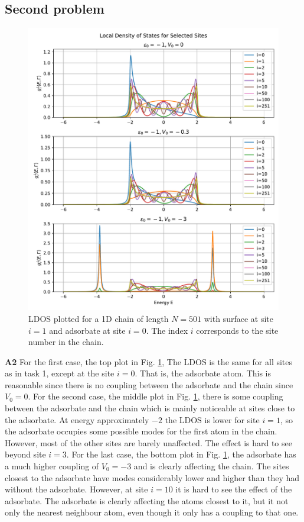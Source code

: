 \subsection{Second problem}

\begin{figure}[H]
    \centering    \includegraphics[width=\textwidth]{Figures/task2.pdf}
    \caption{LDOS plotted for a 1D chain of length $N=501$ with surface at site $i=1$ and adsorbate at site $i=0$. The index $i$ corresponds to the site number in the chain.}
    \label{fig:task2}
\end{figure}

\textbf{A2} For the first case, the top plot in Fig. \ref{fig:task2}, The LDOS is the same for all sites as in task 1, except at the site $i=0$. That is, the adsorbate atom. This is reasonable since there is no coupling between the adsorbate and the chain since $V_0 = 0$. For the second case, the middle plot in Fig. \ref{fig:task2}, there is some coupling between the adsorbate and the chain which is mainly noticeable at sites close to the adsorbate. At energy approximately $-2$ the LDOS is lower for site $i=1$, so the adsorbate occupies some possible modes for the first atom in the chain. However, most of the other sites are barely unaffected. The effect is hard to see beyond site $i=3$. For the last case, the bottom plot in Fig. \ref{fig:task2}, the adsorbate has a much higher coupling of $V_0 = -3$ and is clearly affecting the chain. The sites closest to the adsorbate have modes considerably lower and higher than they had without the adsorbate. However, at site $i=10$ it is hard to see the effect of the adsorbate. The adsorbate is clearly affecting the atoms closest to it, but it not only the nearest neighbour atom, even though it only has a coupling to that one.


